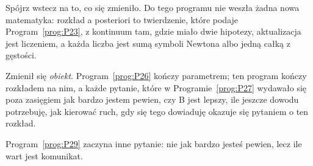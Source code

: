 \begin{fr}
Spójrz wstecz na to, co się zmieniło. Do tego programu nie weszła żadna nowa
matematyka: rozkład a posteriori to twierdzenie, które podaje
Program~\ref{prog:P23}, z kontinuum tam, gdzie miało dwie hipotezy,
aktualizacja jest liczeniem, a każda liczba jest sumą symboli Newtona albo
jedną całką z gęstości.

Zmienił się \emph{obiekt}. Program~\ref{prog:P26} kończy parametrem; ten
program kończy rozkładem na nim, a każde pytanie, które w
Programie~\ref{prog:P27} wydawało się poza zasięgiem \dash{} jak bardzo jestem
pewien, czy B jest lepszy, ile jeszcze dowodu potrzebuję, jak kierować ruch,
gdy się tego dowiaduję \dash{} okazuje się pytaniem o ten rozkład.

Program~\ref{prog:P29} zaczyna inne pytanie: nie jak bardzo jesteś pewien,
lecz ile wart jest komunikat.
\end{fr}

